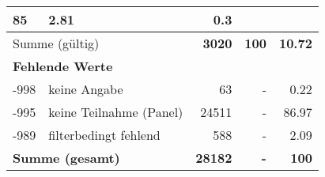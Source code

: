 \begin{longtable}{lXrrr}
       \num{85} &
       \num[round-mode=places,round-precision=2]{2,81} &
         \num[round-mode=places,round-precision=2]{0,3} \\
     \midrule
     \multicolumn{2}{l}{Summe (gültig)} &
       \textbf{\num{3020}} &
     \textbf{100} &
       \textbf{\num[round-mode=places,round-precision=2]{10,72}} \\
     \multicolumn{5}{l}{\textbf{Fehlende Werte}}\\
       -998 &
       keine Angabe &
         \num{63} &
        - &
         \num[round-mode=places,round-precision=2]{0,22} \\
       -995 &
       keine Teilnahme (Panel) &
         \num{24511} &
        - &
         \num[round-mode=places,round-precision=2]{86,97} \\
       -989 &
       filterbedingt fehlend &
         \num{588} &
        - &
         \num[round-mode=places,round-precision=2]{2,09} \\
     \midrule
     \multicolumn{2}{l}{\textbf{Summe (gesamt)}} &
          \textbf{\num{28182}} &
        \textbf{-} &
        \textbf{100} \\
     \bottomrule
     \end{longtable}
     
